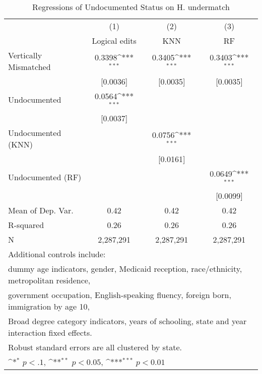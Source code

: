\begin{table}[htbp]\centering
\def\sym#1{\ifmmode^{#1}\else\(^{#1}\)\fi}
\caption{Regressions of Undocumented Status on H. undermatch}
\begin{tabular}{l*{3}{c}}
\toprule
                    &\multicolumn{1}{c}{(1)}         &\multicolumn{1}{c}{(2)}         &\multicolumn{1}{c}{(3)}         \\
                    &Logical edits         &         KNN         &          RF         \\
\midrule
Vertically Mismatched&      0.3398\sym{***}&      0.3405\sym{***}&      0.3403\sym{***}\\
                    &    [0.0036]         &    [0.0035]         &    [0.0035]         \\
\addlinespace
Undocumented        &      0.0564\sym{***}&                     &                     \\
                    &    [0.0037]         &                     &                     \\
\addlinespace
Undocumented (KNN)  &                     &      0.0756\sym{***}&                     \\
                    &                     &    [0.0161]         &                     \\
\addlinespace
Undocumented (RF)   &                     &                     &      0.0649\sym{***}\\
                    &                     &                     &    [0.0099]         \\
\midrule
Mean of Dep. Var.   &        0.42         &        0.42         &        0.42         \\
R-squared           &        0.26         &        0.26         &        0.26         \\
N                   &   2,287,291         &   2,287,291         &   2,287,291         \\
\bottomrule
\multicolumn{4}{l}{\footnotesize Additional controls include:}\\
\multicolumn{4}{l}{\footnotesize dummy age indicators, gender, Medicaid reception, race/ethnicity, metropolitan residence,}\\
\multicolumn{4}{l}{\footnotesize government occupation, English-speaking fluency, foreign born, immigration by age 10,}\\
\multicolumn{4}{l}{\footnotesize Broad degree category indicators, years of schooling, state and year interaction fixed effects.}\\
\multicolumn{4}{l}{\footnotesize Robust standard errors are all clustered by state.}\\
\multicolumn{4}{l}{\footnotesize \sym{*} \(p<.1\), \sym{**} \(p<0.05\), \sym{***} \(p<0.01\)}\\
\end{tabular}
\end{table}
